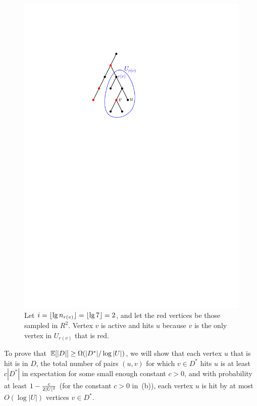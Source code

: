 \begin{figure}\centering
\includegraphics[scale=1]{hits.pdf}
\caption{Let $i=\lfloor\lg n_{r(v)}\rfloor=\lfloor\lg 7\rfloor=2$, and let the red vertices be those sampled in $R^2$. Vertex $v$ is active and hits $u$ because $v$ is the only vertex in $U_{r(v)}$ that is red.}\label{fig:hits}
\end{figure}

To prove that $\mathbb E[|D|] \ge \Omega(|D^*|/\log|U|)$, we will show that
 \BE
 \im[(a)] each vertex $u$ that is hit is in $D$, 
 \im[(b)] the total number of pairs $(u,v)$ for which $v\in D^*$ hits $u$ is at least $c |D^*|$ in expectation for some small enough constant $c>0$, and
 \im[(c)] with probability at least $1-\frac c{2|U|^2}$ (for the constant $c>0$ in~(b)), each vertex $u$ is hit by at most $O(\log|U|)$ vertices $v\in D^*$. %
 \EE


